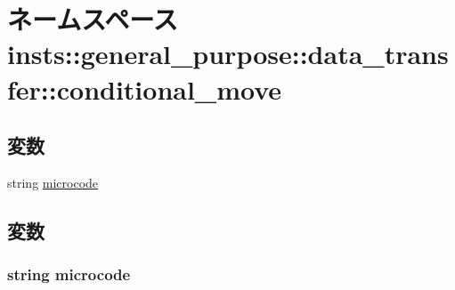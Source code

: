\hypertarget{namespaceinsts_1_1general__purpose_1_1data__transfer_1_1conditional__move}{
\section{ネームスペース insts::general\_\-purpose::data\_\-transfer::conditional\_\-move}
\label{namespaceinsts_1_1general__purpose_1_1data__transfer_1_1conditional__move}
}
\subsection*{変数}
\begin{DoxyCompactItemize}
\item 
string \hyperlink{namespaceinsts_1_1general__purpose_1_1data__transfer_1_1conditional__move_a770f11a173e99389a8802f0107ed8f52}{microcode}
\end{DoxyCompactItemize}


\subsection{変数}
\hypertarget{namespaceinsts_1_1general__purpose_1_1data__transfer_1_1conditional__move_a770f11a173e99389a8802f0107ed8f52}{
\subsubsection[{microcode}]{\setlength{\rightskip}{0pt plus 5cm}string {\bf microcode}}}
\label{namespaceinsts_1_1general__purpose_1_1data__transfer_1_1conditional__move_a770f11a173e99389a8802f0107ed8f52}
